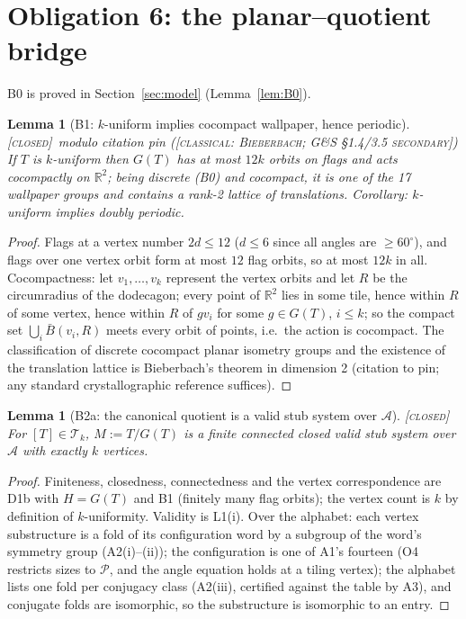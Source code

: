 \documentclass[11pt]{article}
\newtheorem{lemma}[theorem]{Lemma}
\theoremstyle{definition}
\newcommand{\CLASSICAL}[1]{\textnormal{\textsc{[classical: #1]}}}
\newcommand{\CLOSED}{\textnormal{\textsc{[closed]}}}
\newcommand{\A}{\mathcal{A}}
\newcommand{\T}{\mathcal{T}}
\newcommand{\R}{\mathbb{R}}
\begin{document}
\section{Obligation 6: the planar--quotient bridge}\label{sec:bridge}

B0 is proved in Section~\ref{sec:model} (Lemma~\ref{lem:B0}).

\begin{lemma}[B1: $k$-uniform implies cocompact wallpaper, hence periodic]\label{lem:B1}
\CLOSED\ modulo citation pin (\CLASSICAL{Bieberbach; G\&S \S1.4/3.5 secondary})\;
If $T$ is $k$-uniform then $G(T)$ has at most $12k$ orbits on flags and acts cocompactly
on $\R^2$; being discrete (B0) and cocompact, it is one of the 17 wallpaper groups and
contains a rank-2 lattice of translations. Corollary: $k$-uniform implies doubly
periodic.
\end{lemma}

\begin{proof}
Flags at a vertex number $2d \le 12$ ($d \le 6$ since all angles are $\ge 60^\circ$), and
flags over one vertex orbit form at most $12$ flag orbits, so at most $12k$ in all.
Cocompactness: let $v_1, \dots, v_k$ represent the vertex orbits and let $R$ be the
circumradius of the dodecagon; every point of $\R^2$ lies in some tile, hence within $R$
of some vertex, hence within $R$ of $g v_i$ for some $g \in G(T)$, $i \le k$; so the
compact set $\bigcup_i \bar B(v_i, R)$ meets every orbit of points, i.e.\ the action is
cocompact. The classification of discrete cocompact planar isometry groups and the
existence of the translation lattice is Bieberbach's theorem in dimension 2 (citation to
pin; any standard crystallographic reference suffices).
\end{proof}

\begin{lemma}[B2a: the canonical quotient is a valid stub system over $\A$]\label{lem:B2a}
\CLOSED\;
For $[T] \in \T_k$, $M := T/G(T)$ is a finite connected closed valid stub system over
$\A$ with exactly $k$ vertices.
\end{lemma}

\begin{proof}
Finiteness, closedness, connectedness and the vertex correspondence are D1b with
$H = G(T)$ and B1 (finitely many flag orbits); the vertex count is $k$ by definition of
$k$-uniformity. Validity is L1(i). Over the alphabet: each vertex substructure is a fold
of its configuration word by a subgroup of the word's symmetry group (A2(i)--(ii)); the
configuration is one of A1's fourteen (O4 restricts sizes to $\mathcal{P}$, and the angle
equation holds at a tiling vertex); the alphabet lists one fold per conjugacy class
(A2(iii), certified against the table by A3), and conjugate folds are isomorphic, so the
substructure is isomorphic to an entry.
\end{proof}
\end{document}
